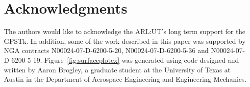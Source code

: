 \section*{Acknowledgments}

The authors would like to acknowledge the ARL:UT's long term
support for the GPSTk. In addition, some of the work described
in this paper was supported by NGA contracts N00024-07-D-6200-5-20,
N00024-07-D-6200-5-36 and N00024-07-D-6200-5-19. Figure~\ref{fig:surfaceplotex} was generated using code designed and written by Aaron Brogley,
a graduate student at the University of Texas at Austin in the 
Department of Aerospace Engineering and Engineering Mechanics. 
